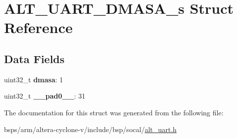 \hypertarget{structALT__UART__DMASA__s}{}\section{A\+L\+T\+\_\+\+U\+A\+R\+T\+\_\+\+D\+M\+A\+S\+A\+\_\+s Struct Reference}
\label{structALT__UART__DMASA__s}
\subsection*{Data Fields}
\begin{DoxyCompactItemize}
\item 
\mbox{\label{structALT__UART__DMASA__s_ac250e588e2cf0a9cd1380844446c76f7}} 
uint32\+\_\+t {\bfseries dmasa}\+: 1
\item 
\mbox{\label{structALT__UART__DMASA__s_a1894567a17fe530f2dbe48921b0cdd21}} 
uint32\+\_\+t {\bfseries \+\_\+\+\_\+pad0\+\_\+\+\_\+}\+: 31
\end{DoxyCompactItemize}


The documentation for this struct was generated from the following file\+:\begin{DoxyCompactItemize}
\item 
bsps/arm/altera-\/cyclone-\/v/include/bsp/socal/\mbox{\hyperlink{alt__uart_8h}{alt\+\_\+uart.\+h}}\end{DoxyCompactItemize}
